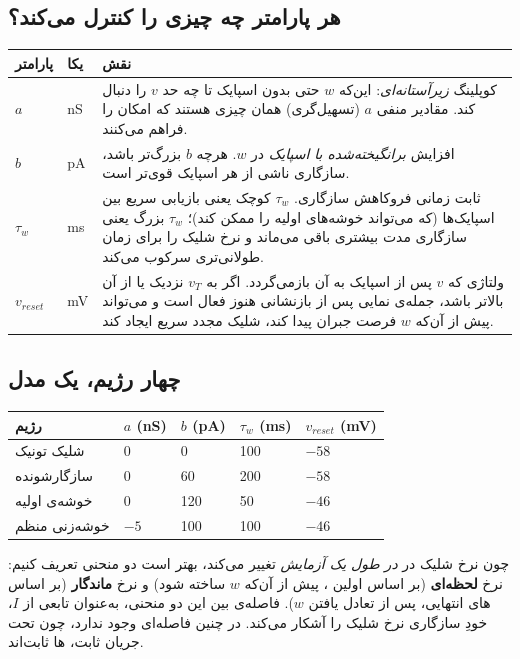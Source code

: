 \documentclass[11pt,a4paper]{article}
\begin{document}
\subsection{هر پارامتر چه چیزی را کنترل می‌کند؟}
\begin{center}
	\begin{tabular}{@{}p{1.8cm}p{2.6cm}p{9.1cm}@{}}
		\toprule
		\textbf{پارامتر} & \textbf{یکا} & \textbf{نقش} \\
		\midrule
		$a$ & nS & کوپلینگ \emph{زیرآستانه‌ای}: این‌که $w$ حتی بدون اسپایک تا چه حد $v$ را دنبال کند. مقادیر منفی $a$ (تسهیل‌گری) همان چیزی هستند که امکان \lr{bursting} را فراهم می‌کنند. \\
		$b$ & pA & افزایش \emph{برانگیخته‌شده با اسپایک} در $w$. هرچه $b$ بزرگ‌تر باشد، سازگاری ناشی از هر اسپایک قوی‌تر است. \\
		$\tau_w$ & ms & ثابت زمانی فروکاهش سازگاری. $\tau_w$ کوچک یعنی بازیابی سریع بین اسپایک‌ها (که می‌تواند خوشه‌های اولیه را ممکن کند)؛ $\tau_w$ بزرگ یعنی سازگاری مدت بیشتری باقی می‌ماند و نرخ شلیک را برای زمان طولانی‌تری سرکوب می‌کند. \\
		$v_{reset}$ & mV & ولتاژی که $v$ پس از اسپایک به آن بازمی‌گردد. اگر به $v_T$ نزدیک یا از آن بالاتر باشد، جمله‌ی نمایی پس از بازنشانی هنوز فعال است و می‌تواند پیش از آن‌که $w$ فرصت جبران پیدا کند، شلیک مجدد سریع ایجاد کند. \\
		\bottomrule
	\end{tabular}
\end{center}

\subsection{چهار رژیم، یک مدل}
\begin{center}
	\begin{tabular}{@{}lllll@{}}
		\toprule
		\textbf{رژیم} & $a$ (nS) & $b$ (pA) & $\tau_w$ (ms) & $v_{reset}$ (mV) \\
		\midrule
		شلیک تونیک & 0 & 0 & 100 & $-58$ \\
		سازگارشونده & 0 & 60 & 200 & $-58$ \\
		خوشه‌ی اولیه & 0 & 120 & 50 & $-46$ \\
		خوشه‌زنی منظم & $-5$ & 100 & 100 & $-46$ \\
		\bottomrule
	\end{tabular}
\end{center}

\begin{keybox}
	چون نرخ شلیک در  \emph{در طول یک آزمایش} تغییر می‌کند، بهتر است دو منحنی  تعریف کنیم: نرخ \textbf{لحظه‌ای} (بر اساس اولین ، پیش از آن‌که $w$ ساخته شود) و نرخ \textbf{ماندگار} (بر اساس ‌های انتهایی، پس از تعادل یافتن $w$). فاصله‌ی بین این دو منحنی، به‌عنوان تابعی از $I$، خودِ سازگاری نرخ شلیک را آشکار می‌کند. در  چنین فاصله‌ای وجود ندارد، چون تحت جریان ثابت، ها ثابت‌اند.
\end{keybox}
\end{document}
